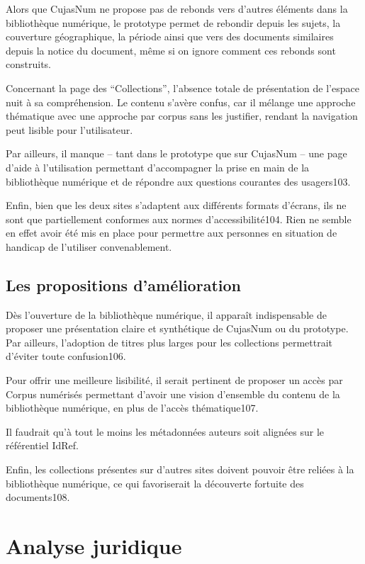 Alors que CujasNum ne propose pas de rebonds vers d’autres éléments dans la bibliothèque numérique, le prototype permet de rebondir depuis les sujets, la couverture géographique, la période ainsi que vers des documents similaires depuis la notice du document, même si on ignore comment ces rebonds sont construits. 

Concernant la page des \enquote{Collections}, l’absence totale de présentation de l’espace nuit à sa compréhension. Le contenu s’avère confus, car il mélange une approche thématique avec une approche par corpus sans les justifier, rendant la navigation peut lisible pour l’utilisateur.  

Par ailleurs, il manque – tant dans le prototype que sur CujasNum – une page d’aide à l’utilisation permettant d’accompagner la prise en main de la bibliothèque numérique et de répondre aux questions courantes des usagers103. 

Enfin, bien que les deux sites s’adaptent aux différents formats d’écrans, ils ne sont que partiellement conformes aux normes d’accessibilité104. Rien ne semble en effet avoir été mis en place pour permettre aux personnes en situation de handicap de l’utiliser convenablement.  

\subsection{Les propositions d’amélioration}

Dès l’ouverture de la bibliothèque numérique, il apparaît indispensable de proposer une présentation claire et synthétique de CujasNum ou du prototype. Par ailleurs, l’adoption de titres plus larges pour les collections permettrait d’éviter toute confusion106.  

Pour offrir une meilleure lisibilité, il serait pertinent de proposer un accès par Corpus numérisés permettant d’avoir une vision d’ensemble du contenu de la bibliothèque numérique, en plus de l’accès thématique107. 

Il faudrait qu’à tout le moins les métadonnées auteurs soit alignées sur le référentiel IdRef.  

Enfin, les collections présentes sur d’autres sites doivent pouvoir être reliées à la bibliothèque numérique, ce qui favoriserait la découverte fortuite des documents108. 



\section{Analyse juridique} 

